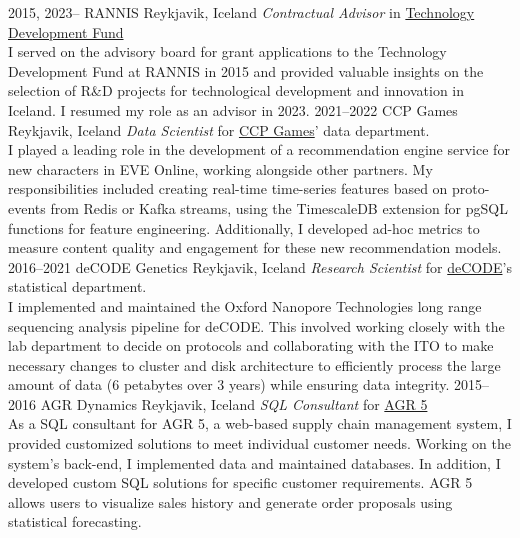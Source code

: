 \documentclass[]{cv} %
\begin{document}
\begin{entrylist}
\entry
{2015, 2023--}
{RANNIS}
{Reykjavik, Iceland}
{\emph{Contractual Advisor} in 
	\href{http://www.rannis.is/sjodir/rannsoknir/taeknithrounarsjodur/fagrad/}{Technology
		Development Fund}\\
	I served on the advisory board for grant applications to the Technology Development Fund at RANNIS in 2015 and provided valuable insights on the selection of R\&D projects for technological development and innovation in Iceland. 
	I resumed my role as an advisor in 2023.
}
\entry
{2021--2022}
{CCP Games}
{Reykjavik, Iceland}
{\emph{Data Scientist} for
	\href{https://www.ccpgames.com/}{CCP Games}' data department.\\
I played a leading role in the development of a recommendation engine service for new characters in EVE Online, working alongside other partners. My responsibilities included creating real-time time-series features based on proto-events from Redis or Kafka streams, using the TimescaleDB extension for pgSQL functions for feature engineering. Additionally, I developed ad-hoc metrics to measure content quality and engagement for these new recommendation models.
}
\entry
{2016--2021}
{deCODE Genetics}
{Reykjavik, Iceland}
{\emph{Research Scientist} for
    \href{https://www.decode.com/}{deCODE}'s statistical department.\\
    I implemented and maintained the Oxford Nanopore Technologies long range sequencing analysis pipeline for deCODE. This involved working closely with the lab department to decide on protocols and collaborating with the ITO to make necessary changes to cluster and disk architecture to efficiently process the large amount of data (6 petabytes over 3 years) while ensuring data integrity. 
}
\entry
{2015--2016}
{AGR Dynamics}
{Reykjavik, Iceland}
{\emph{SQL Consultant} for
    \href{http://agrdynamics.com/}{AGR 5}\\
As a SQL consultant for AGR 5, a web-based supply chain management system, I provided customized solutions to meet individual customer needs. Working on the system's back-end, I implemented data and maintained databases. In addition, I developed custom SQL solutions for specific customer requirements. AGR 5 allows users to visualize sales history and generate order proposals using statistical forecasting.
}    
\end{entrylist}
\end{document}
